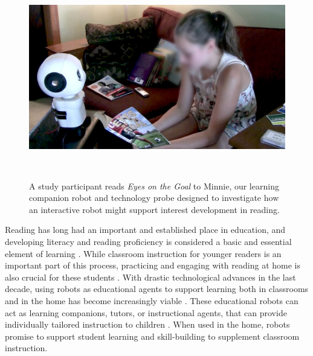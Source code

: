 \documentclass{sigchi}
\begin{document}
\begin{figure}[t]
	\centering
	\includegraphics[width=1\columnwidth]{figures/chi17-michaelis-figures-teaser2.jpg}
	\caption{A study participant reads \textit{Eyes on the Goal} to Minnie, our learning companion robot and technology probe designed to investigate how an interactive robot might support interest development in reading.}~\label{fig:teaser}
	\vspace{-8pt}
\end{figure}

Reading has long had an important and established place in education, and developing literacy and reading proficiency is considered a basic and essential element of learning \cite{McCormick:1994,Freire:1983}. While classroom instruction for younger readers is an important part of this process, practicing and engaging with reading at home is also crucial for these students \cite{Baker:1997}. With drastic technological advances in the last decade, using robots as educational agents to support learning both in classrooms and in the home has become increasingly viable \cite{Benitti:2012}. These educational robots can act as learning companions, tutors, or instructional agents, that can provide individually tailored instruction to children \cite{Miller:2008}. When used in the home, robots promise to support student learning and skill-building to supplement classroom instruction.
\end{document}
